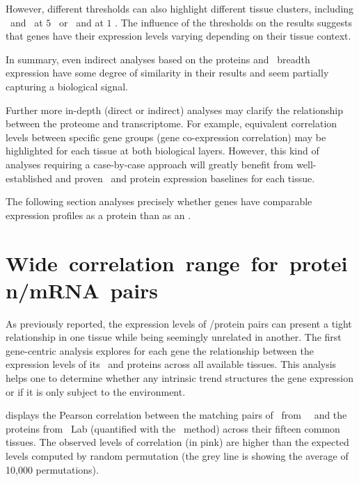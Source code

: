 However, different thresholds can also highlight different tissue clusters,
including \Rectum\ and \hColon\ at $5$ \FPKM\
or \Pancreas\ and \Gall{} at $1$ \FPKM{}.
The influence of the thresholds on the results suggests that
genes have their expression levels varying
depending on their tissue context.\mybr\

In summary,
even indirect analyses based on the proteins and \mRNAs\ breadth expression
have some degree of similarity in their results
and seem partially capturing a biological signal.\mybr\

Further more in-depth (direct or indirect) analyses
may clarify the relationship between the proteome and transcriptome.
For example, equivalent correlation levels between specific gene groups
(gene co-expression correlation) may be highlighted
for each tissue at both biological layers.
However, this kind of analyses requiring a case-by-case approach
will greatly benefit from
well-established and proven \mRNA\ and protein expression baselines
for each tissue.\mybr\

The following section  analyses precisely
whether genes have comparable expression profiles
as a protein than as an \mRNA{}.\mybr\
\vspace{-2.5mm}

\section{Wide~correlation~range~for~protein/mRNA~pairs}\label{sec:GenesCorRNAProt}
\vspace{-3mm}
As previously reported, %
the expression levels of \mRNA/protein pairs can present
a tight relationship in one tissue
while being seemingly unrelated in another.
The first gene-centric analysis explores for each gene
the relationship between the expression levels of its \mRNAs\ and proteins
across all available tissues.
This analysis helps one to determine
whether any intrinsic trend structures the gene expression
or if it is only subject to the environment.\mybr\

 displays the Pearson correlation
between the matching pairs of \mRNAs\ from \uhlen\ \etal\
and the proteins from \pandey\ Lab (quantified with the \PPKM\ method)
across their fifteen common tissues.
The observed levels of correlation (in pink) are higher
than the expected levels computed by random permutation
(the grey line is showing the average of 10,000 permutations).\mybr\

